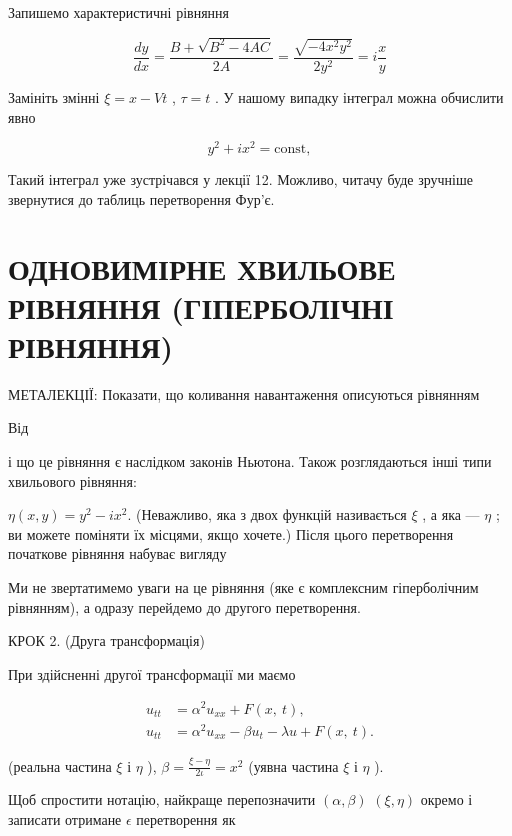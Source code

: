\documentclass[
  ukrainian,
]{article}
\begin{document}
Запишемо характеристичні рівняння

\[
\frac{dy}{dx} = \frac{B + \sqrt{B^2 - 4AC}}{2A} = \frac{\sqrt{-4x^2y^2}}{2y^2} = i\frac{x}{y}
\]

Замініть змінні \(\xi = x - Vt\) , \(\tau = t\) . У нашому випадку
інтеграл можна обчислити явно

\[
y^2 + ix^2 = \text{const},
\]

Такий інтеграл уже зустрічався у лекції 12. Можливо, читачу буде
зручніше звернутися до таблиць перетворення Фур'є.

\section{ОДНОВИМІРНЕ ХВИЛЬОВЕ РІВНЯННЯ (ГІПЕРБОЛІЧНІ
РІВНЯННЯ)}\label{ux43eux434ux43dux43eux432ux438ux43cux456ux440ux43dux435-ux445ux432ux438ux43bux44cux43eux432ux435-ux440ux456ux432ux43dux44fux43dux43dux44f-ux433ux456ux43fux435ux440ux431ux43eux43bux456ux447ux43dux456-ux440ux456ux432ux43dux44fux43dux43dux44f}

МЕТАЛЕКЦІЇ: Показати, що коливання навантаження описуються рівнянням

Від

і що це рівняння є наслідком законів Ньютона. Також розглядаються інші
типи хвильового рівняння:

\(\eta(x, y) = y^2 - ix^2.\) (Неважливо, яка з двох функцій називається
\(\xi\) , а яка --- \(\eta\) ; ви можете поміняти їх місцями, якщо
хочете.) Після цього перетворення початкове рівняння набуває вигляду

Ми не звертатимемо уваги на це рівняння (яке є комплексним гіперболічним
рівнянням), а одразу перейдемо до другого перетворення.

КРОК 2. (Друга трансформація)

При здійсненні другої трансформації ми маємо

\[
\begin{split} u_{tt} &= \alpha^2 u_{xx} + F\left(x, \ t\right), \\ u_{tt} &= \alpha^2 u_{xx} - \beta u_t - \lambda u + F\left(x, \ t\right). \end{split}
\]

(реальна частина \(\xi\) і \(\eta\) ),
\(\beta = \frac{\xi - \eta}{2\iota} = x^2\) (уявна частина \(\xi\) і
\(\eta\) ).

Щоб спростити нотацію, найкраще перепозначити \((\alpha,\beta)\)
\((\xi,\eta)\) окремо і записати отримане \(\epsilon\) перетворення як
\end{document}
